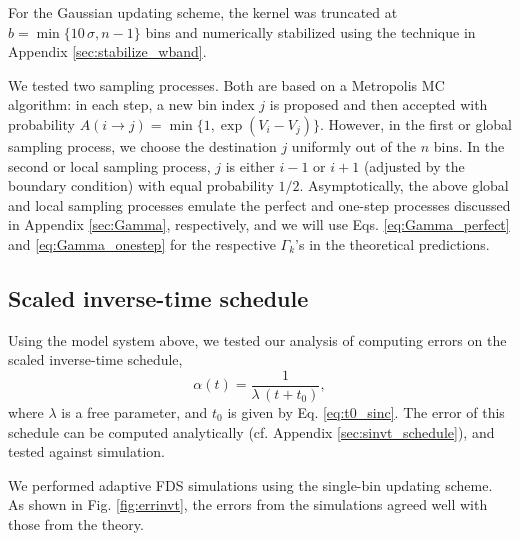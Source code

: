 \documentclass[reprint, superscriptaddress, floatfix]{revtex4-1}
\begin{document}
For the Gaussian updating scheme,
the kernel was truncated at
$b = \min\{10 \, \sigma, n - 1\}$ bins
and numerically stabilized
using the technique
in Appendix \ref{sec:stabilize_wband}.



We tested two sampling processes.
%
Both are based on
a Metropolis MC algorithm\cite{
  metropolis1953, newman, frenkel,
  landau_binder}:
%
in each step, a new bin index $j$ is proposed
and then accepted with probability
%
$
A(i \to j) = \min\{ 1, \exp(V_i - V_j) \}.
$
However,
in the first or global sampling process,
we choose the destination $j$
uniformly out of the $n$ bins.
%
In the second or local sampling process,
$j$ is either $i - 1$ or $i + 1$
(adjusted by the boundary condition)
with equal probability $1/2$.
%
Asymptotically,
the above global and local sampling processes
emulate the perfect and one-step processes
discussed in Appendix \ref{sec:Gamma},
respectively,
and we will use
Eqs. \eqref{eq:Gamma_perfect}
and \eqref{eq:Gamma_onestep}
for the respective $\Gamma_k$'s
in the theoretical predictions.
%



\subsection{\label{sec:results_invt}
Scaled inverse-time schedule}


Using the model system above, we
tested our analysis of computing errors
on the scaled inverse-time schedule,
%
\begin{equation}
\alpha(t) = \frac{1}{\lambda \, (t + t_0) },
\label{eq:alpha_invtlambda}
\end{equation}
%
where $\lambda$ is a free parameter,
and $t_0$ is given by Eq. \eqref{eq:t0_sinc}.
%
The error of this schedule
can be computed analytically
(cf. Appendix \ref{sec:sinvt_schedule}),
and tested against simulation.



We performed adaptive FDS simulations
using the single-bin updating scheme.
%
%
As shown in Fig. \ref{fig:errinvt},
the errors from the simulations
agreed well with those from the theory.
\end{document}
